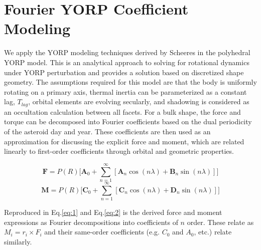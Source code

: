\section{Fourier YORP Coefficient Modeling}
We apply the YORP modeling techniques derived by Scheeres in the polyhedral YORP model. This is an analytical approach to solving for rotational dynamics under YORP perturbation and provides a solution based on discretized shape geometry. The assumptions required for this model are that the body is uniformly rotating on a primary axis, thermal inertia can be parameterized as a constant lag, $T_{lag}$, orbital elements are evolving secularly, and shadowing is considered as an occultation calculation between all facets. For a bulk shape, the force and torque can be decomposed into Fourier coefficients based on the dual periodicity of the asteroid day and year. These coefficients are then used as an approximation for discussing the explicit force and moment, which are related linearly to first-order coefficients through orbital and geometric properties. 


\begin{equation} \label{eq:1}
    \textbf{F} = P(R) \Big[ \textbf{A}_0 + \sum_{n=1}^{\infty} [ \textbf{A}_n \cos(n\lambda) + \textbf{B}_n \sin(n\lambda) ]\Big]
\end{equation}
\begin{equation} \label{eq:2}
    \textbf{M} = P(R) \Big[ \textbf{C}_0 + \sum_{n=1}^{\infty} [ \textbf{C}_n \cos(n\lambda) + \textbf{D}_n \sin(n\lambda) ]\Big]
\end{equation}

Reproduced in Eq.\ref{eq:1} and Eq.\ref{eq:2} is the derived force and moment expressions as Fourier decompositions into coefficients of $n$ order. These relate as $M_i = r_i \times F_i$ and their same-order coefficients (e.g. $C_0$ and $A_0$, etc.) relate similarly. 

